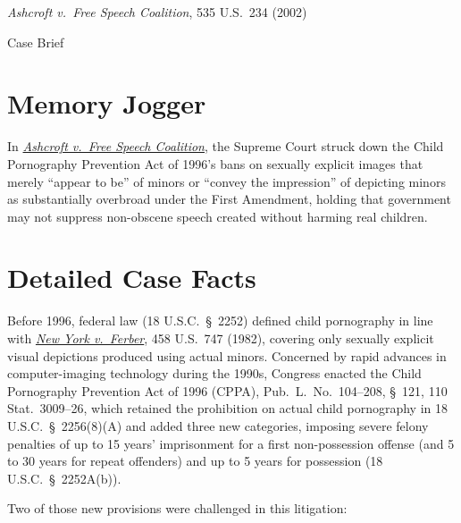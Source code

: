\documentclass[12pt]{article}
\begin{document}
\begin{center}
{\LARGE \textit{Ashcroft v.\ Free Speech Coalition}, 535 U.S.\ 234 (2002)\par}
\vspace{0.8em}
{\large Case Brief\par}
\end{center}
\vspace{1em}

\section{Memory Jogger}

In \href{https://supreme.justia.com/cases/federal/us/535/234/}{\textit{Ashcroft v.\ Free Speech Coalition}}, the Supreme Court struck down the Child Pornography Prevention Act of 1996's bans on sexually explicit images that merely ``appear to be'' of minors or ``convey the impression'' of depicting minors as substantially overbroad under the First Amendment, holding that government may not suppress non-obscene speech created without harming real children.

\section{Detailed Case Facts}

Before 1996, federal law (18 U.S.C.\ \S~2252) defined child pornography in line with \href{https://supreme.justia.com/cases/federal/us/458/747/}{\textit{New York v.\ Ferber}}, 458 U.S.\ 747 (1982), covering only sexually explicit visual depictions produced using actual minors. Concerned by rapid advances in computer-imaging technology during the 1990s, Congress enacted the Child Pornography Prevention Act of 1996 (CPPA), Pub.\ L.\ No.\ 104--208, \S~121, 110 Stat.\ 3009--26, which retained the prohibition on actual child pornography in 18 U.S.C.\ \S~2256(8)(A) and added three new categories, imposing severe felony penalties of up to 15 years' imprisonment for a first non-possession offense (and 5 to 30 years for repeat offenders) and up to 5 years for possession (18 U.S.C.\ \S~2252A(b)).

Two of those new provisions were challenged in this litigation:
\end{document}
